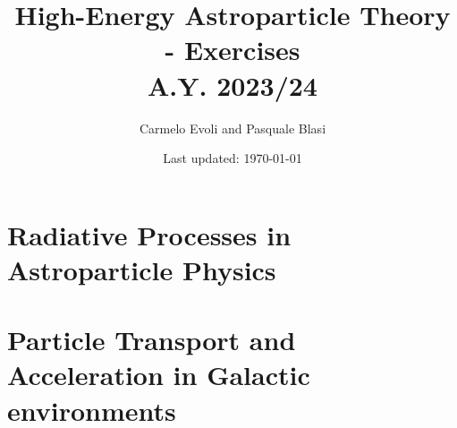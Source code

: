 \documentclass[letterpaper, 11pt, notitlepage]{report}
\begin{document}
\title{High-Energy Astroparticle Theory - {\color{blue}Exercises} \\[1em]
\normalsize A.Y. 2023/24}

\author{\normalsize Carmelo Evoli and Pasquale Blasi}
\date{\normalsize\vspace{-1ex} Last updated: \today}

\maketitle

\tableofcontents\label{sec:contents}

\newpage

\chapter{Radiative Processes in Astroparticle Physics} 











\chapter{Particle Transport and Acceleration in Galactic environments}





\newpage








\end{document}
